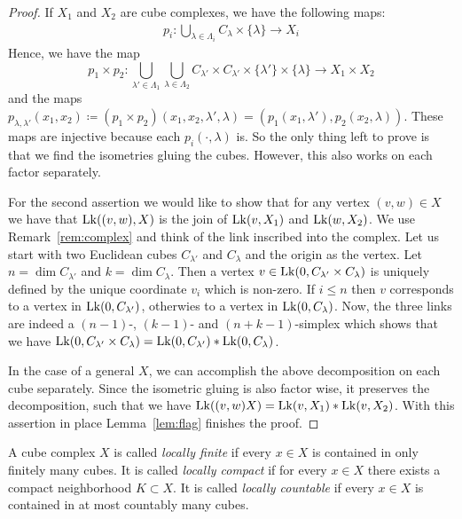 \begin{proof}
  If \(X_1\) and \(X_2\) are cube complexes, we have the following maps:
  \begin{align*}
    p_i \colon \bigcup_{\lambda \in \Lambda_i} C_\lambda \times \{\lambda\} \to X_i
  \end{align*}
  Hence, we have the map
  \[
    p_1 \times p_2 \colon \bigcup_{\lambda' \in \Lambda_1} \bigcup_{\lambda \in \Lambda_2} C_{\lambda'} \times C_{\lambda'} \times \{\lambda'\} \times \{\lambda\} \to X_1 \times X_2
  \]
  and the maps \(p_{\lambda, \lambda'}(x_1,x_2) \coloneqq (p_1 \times p_2)(x_1, x_2, \lambda', \lambda) = (p_1(x_1, \lambda'), p_2(x_2, \lambda))\). These maps are injective because each \(p_i(\cdot, \lambda)\) is. So the only thing left to prove is that we find the isometries gluing the cubes. However, this also works on each factor separately.

  For the second assertion we would like to show that for any vertex \((v,w) \in X\) we have that \(\operatorname{Lk}((v,w), X)\) is the join of \(\operatorname{Lk}(v, X_1)\) and \(\operatorname{Lk}(w,X_2)\). We use Remark~\ref{rem:complex} and think of the link inscribed into the complex. Let us start with two Euclidean cubes \(C_{\lambda'}\) and \(C_\lambda\) and the origin as the vertex. Let \(n = \dim C_{\lambda'}\) and \(k = \dim C_\lambda\). Then a vertex \(v \in \operatorname{Lk}(0, C_{\lambda'} \times C_{\lambda})\) is uniquely defined by the unique coordinate \(v_i\) which is non-zero. If \(i \leq n\) then \(v\) corresponds to a vertex in \(\operatorname{Lk}(0, C_{\lambda'})\), otherwies to a vertex in \(\operatorname{Lk}(0, C_\lambda)\). Now, the three links are indeed a \((n-1)\)-, \((k-1)\)- and \((n+k-1)\)-simplex which shows that we have \(\operatorname{Lk}(0, C_{\lambda'} \times C_\lambda) = \operatorname{Lk}(0, C_{\lambda'}) \ast \operatorname{Lk}(0, C_{\lambda})\).

  In the case of a general \(X\), we can accomplish the above decomposition on each cube separately. Since the isometric gluing is also factor wise, it preserves the decomposition, such that we have \(\operatorname{Lk}((v,w) X) = \operatorname{Lk}(v, X_1) \ast \operatorname{Lk}(v, X_2)\). With this assertion in place Lemma~\ref{lem:flag} finishes the proof.
\end{proof}

\begin{defin}
  A cube complex \(X\) is called \emph{locally finite} if every \(x \in X\) is contained in only finitely many cubes. It is called \emph{locally compact} if for every \(x \in X\) there exists a compact neighborhood \(K \subset X\). It is called \emph{locally countable} if every \(x \in X\) is contained in at most countably many cubes.
\end{defin}

